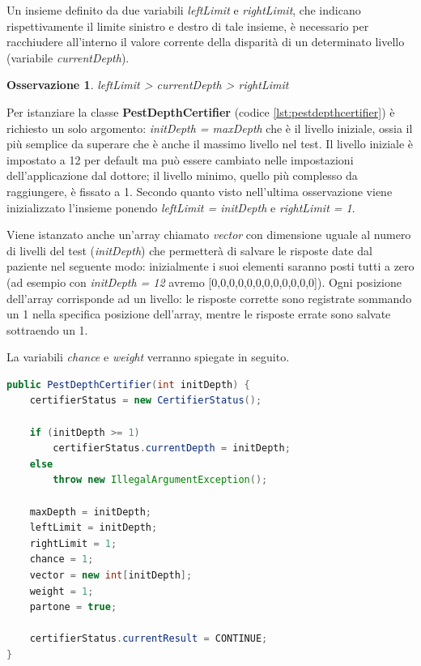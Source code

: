 \documentclass[
	corpo=12pt,
	twoside,
 	evenboxes,
	tipotesi=triennale,
    	stile=classica,
   	 greek,
]{toptesi}
\newtheorem{osservazione}{Osservazione}
\begin{document}
Un insieme definito da due variabili \textit{leftLimit} e \textit{rightLimit}, che indicano rispettivamente il limite sinistro e destro di tale insieme, è necessario per racchiudere all'interno il valore corrente della disparità di un determinato livello (variabile \textit{currentDepth}).

\begin{osservazione}\normalfont
\textit{leftLimit > currentDepth > rightLimit}
\end{osservazione}

Per istanziare la classe \textbf{PestDepthCertifier} (codice \ref{lst:pestdepthcertifier}) è richiesto un solo argomento: \textit{initDepth = maxDepth} che è il livello iniziale, ossia il più semplice da superare che è anche il massimo livello nel test. Il livello iniziale è impostato a 12 per default ma può essere cambiato nelle impostazioni dell'applicazione dal dottore; il livello minimo, quello più complesso da raggiungere, è fissato a 1. Secondo quanto visto nell'ultima osservazione viene inizializzato l'insieme ponendo \textit{leftLimit = initDepth} e \textit{rightLimit = 1}.

Viene istanzato anche un'array chiamato \textit{vector} con dimensione uguale al numero di livelli del test (\textit{initDepth}) che permetterà di salvare le risposte date dal paziente nel seguente modo: inizialmente i suoi elementi saranno posti tutti a zero (ad esempio con \textit{initDepth = 12} avremo [0,0,0,0,0,0,0,0,0,0,0,0]). Ogni posizione dell’array corrisponde ad un livello: le risposte corrette sono registrate sommando un 1 nella specifica posizione dell'array, mentre le risposte errate sono salvate sottraendo un 1.

La variabili \textit{chance}  e \textit{weight} verranno spiegate in seguito.

\begin{lstlisting}[language=Java, label=lst:pestdepthcertifier, caption={Classe PestDepthCertifier}]
public PestDepthCertifier(int initDepth) {
	certifierStatus = new CertifierStatus();

	if (initDepth >= 1)
		certifierStatus.currentDepth = initDepth;
	else
		throw new IllegalArgumentException();

	maxDepth = initDepth;
	leftLimit = initDepth;
	rightLimit = 1;
	chance = 1;
	vector = new int[initDepth];
	weight = 1;
	partone = true;

	certifierStatus.currentResult = CONTINUE;
}
\end{lstlisting}
\end{document}
